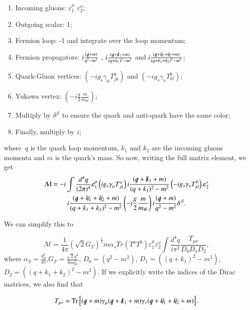 \documentclass[EPJ,twocolumn]{webofc}
\begin{document}
\begin{enumerate}
    \item Incoming gluons: $\varepsilon_1^{\mu}$ $\varepsilon_2^{\nu}$;
    \item Outgoing scalar: 1;
    \item Fermion loop: -1 and integrate over the loop momentum;
    \item Fermion propagators: $i\frac{(\slashed{q}+m)}{q^2-m^2}$ ,  $i\frac{(\slashed{q}+\slashed{k}_1+m)}{(q+k_1)^2-m^2}$ and $i\frac{(\slashed{q}+\slashed{k_1}+\slashed{k_2}+m)}{(q+k_1+k_2)^2-m^2}$;
    \item Quark-Gluon vertices: $\left( -ig_s\gamma_{\mu}T^a_{jk} \right)$ and  $\left( -ig_s\gamma_{\nu}T^b_{kl} \right)$;
    \item Yukawa vertex: $\left(-i\frac{g}{2}\frac{m}{m_W}\right)$;
    \item Multiply by $\delta^{jl}$ to ensure the quark and anti-quark have the same color;
    \item Finally, multiply by $i$;
\end{enumerate}
\noindent where $~q$ is the quark loop momentum, $k_1$ and $k_2$ are the incoming gluons momenta and $m$ is the quark's mass.
So now, writing the full matrix element, we get
\small
\begin{multline}
    \mathcal{M} = -i\int \frac{d^4q}{(2\pi)^4} \varepsilon_1^{\mu}\left( ig_s\gamma_{\mu}T^a_{jk} \right)i\frac{(\slashed{q}+\slashed{k}_1+m)}{(q+k_1)^2-m^2}\left( -ig_s\gamma_{\nu}T^b_{kl} \right)\varepsilon_2^{\nu}\\ i\frac{(\slashed{q}+\slashed{k_1}+\slashed{k_2}+m)}{(q+k_1+k_2)^2-m^2}\left(-i\frac{g}{2}\frac{m}{m_W}\right)i\frac{(\slashed{q}+m)}{q^2-m^2}\delta^{jl}.
\end{multline}

\normalsize
We can simplify this to

\begin{equation}
   \mathcal{M} = \frac{1}{4\pi}\left(\sqrt{2}G_F\right)^{\frac{1}{2}}m\alpha_sTr\left(T^aT^b\right)\varepsilon_1^{\mu}\varepsilon_2^{\nu}\int \frac{d^4q}{i\pi^2}\frac{T_{\mu\nu}}{D_0D_1D_2},
\end{equation}
where $\alpha_S = \frac{g_S^2}{4\pi}$,$G_F = \frac{\sqrt{2}g^2}{8m_W^2}$, $D_0  = \left(q^2-m^2\right)$, $D_1  = \left((q+k_1)^2-m^2\right)$, $D_2  = \left((q+k_1+k_2)^2-m^2\right)$. If we explicitly write the indices of the Dirac matrices, we also find that

\begin{equation} \label{DiracTrace}
    T_{\mu\nu} = \mathrm{Tr}\left[(\slashed{q}+m)\gamma_{\mu}(\slashed{q}+\slashed{k}_1+m)\gamma_{\nu}(\slashed{q}+\slashed{k_1}+\slashed{k_2}+m)\right].
\end{equation}
\end{document}

